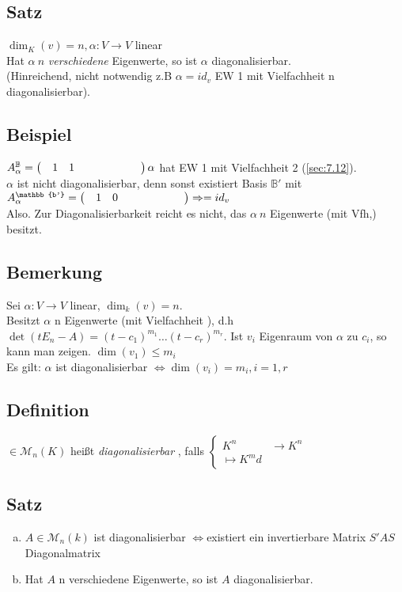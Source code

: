 \subsection{Satz}\label{sec:\thesubsection}
$\dim_K(v) = n, \alpha : V \to V$ linear\\
Hat $\alpha\ n$ \emph{verschiedene} Eigenwerte, so ist $\alpha$ diagonalisierbar.\\
(Hinreichend, nicht notwendig z.B $\alpha = id_v$ EW 1 mit Vielfachheit n diagonalisierbar).
\subsection{Beispiel}\label{sec:\thesubsection}
$A^{\mathbb{B}}_\alpha = \Matrix{1,1;0,1}\\
\alpha$ hat EW 1 mit Vielfachheit 2 (\ref{sec:7.12}).\\
$\alpha$ ist nicht diagonalisierbar, denn sonst existiert Basis $\mathbb{B'}$ mit $A^{\mathbb{b'} }_\alpha = \Matrix{1,0;0,1} \Rightarrow = id_v$\Lightning\\
Also. Zur Diagonalisierbarkeit reicht es nicht, das $\alpha\ n$ Eigenwerte (mit Vfh,) besitzt.
\subsection{Bemerkung}
Sei $\alpha : V \to V$ linear, $\dim_k(v) = n$.\\
Besitzt $\alpha$ n Eigenwerte (mit Vielfachheit ), d.h $\det(t E_n -A) = (t-c_1)^{m_1} \ldots (t -c_r)^{m_r}$. Ist $v_i$ Eigenraum von $\alpha$ zu $c_i$, so kann man zeigen. $\dim(v_1) \leq m_i$\\
Es gilt: $\alpha$ ist diagonalisierbar $\Leftrightarrow \dim(v_i) = m_i, i=1,r$
\subsection{Definition}
$ \in \mathcal{M}_n(K)$ hei\ss t \emph{diagonalisierbar} , falls $\begin{cases}
K^n &\to K^n\\ \mapsto K^md
\end{cases}$
\subsection{Satz}
\begin{enumerate}[a)]
\item $A \in \mathcal{M}_n(k)$ ist diagonalisierbar $\Leftrightarrow$existiert ein invertierbare Matrix $S'A S$ Diagonalmatrix
\item Hat $A$ n verschiedene Eigenwerte, so ist $A$ diagonalisierbar.
\end{enumerate}

